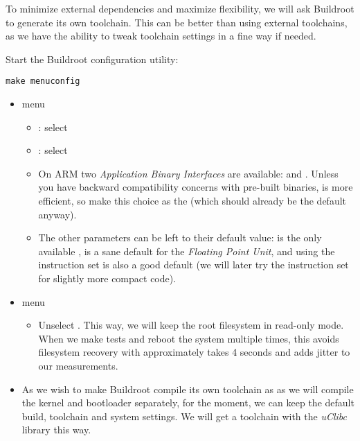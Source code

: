 To minimize external dependencies and maximize flexibility, we will ask
Buildroot to generate its own toolchain. This can be better than using
external toolchains, as we have the ability to tweak toolchain settings
in a fine way if needed.

Start the Buildroot configuration utility:

\begin{verbatim}
make menuconfig
\end{verbatim}

\begin{itemize}

\item {} menu
  \begin{itemize}

  \item {}: select 

  \item {}: select 

  \item On ARM two {\em Application Binary Interfaces} are available:
     and . Unless you have backward
    compatibility concerns with pre-built binaries,  is
    more efficient, so make this choice as the 
    (which should already be the default anyway).

  \item The other parameters can be left to their default value:
     is the only available ,
     is a sane default for the {\em Floating Point
      Unit}, and using the  instruction set is also a good
    default (we will later try the  instruction set for
    slightly more compact code).
  \end{itemize}

\item {} menu
  \begin{itemize}
  \item Unselect .
    This way, we will keep the root filesystem in read-only mode. When
    we make tests and reboot the system multiple times, this avoids
    filesystem recovery with approximately takes 4 seconds and adds
    jitter to our measurements.
  \end{itemize}
\item As we wish to make Buildroot compile its own toolchain as as we
will compile the kernel and bootloader separately, for the moment, we
can keep the default build, toolchain and system settings. We will get
a toolchain with the {\em uClibc} library this way.


\end{itemize}
